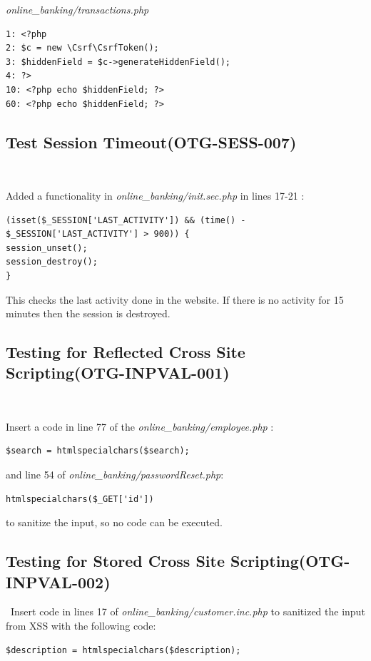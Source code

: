 \documentclass[headsepline,footsepline,footinclude=false,oneside,fontsize=11pt,paper=a4,listof=totoc,bibliography=totoc]{scrbook} %
\begin{document}
\textit{online\_banking/transactions.php}
\begin{lstlisting} 
1: <?php
2: $c = new \Csrf\CsrfToken();
3: $hiddenField = $c->generateHiddenField();
4: ?>
10: <?php echo $hiddenField; ?>
60: <?php echo $hiddenField; ?>
\end{lstlisting}

\pagebreak
\subsection{Test Session Timeout(OTG-SESS-007)}\

Added a functionality in \textit{online\_banking/init.sec.php} in lines 17-21 :  


\begin{lstlisting}
(isset($_SESSION['LAST_ACTIVITY']) && (time() - $_SESSION['LAST_ACTIVITY'] > 900)) { 
session_unset();    
session_destroy();   
}
\end{lstlisting} 


This checks the last activity done in the website. If there is no activity for 15 minutes then the session is destroyed.\\



\subsection{Testing for Reflected Cross Site Scripting(OTG-INPVAL-001)} \

Insert a code in line 77 of the\textit{ online\_banking/employee.php} : 
\begin{lstlisting}
$search = htmlspecialchars($search);  

\end{lstlisting}
and line 54 of \textit{online\_banking/passwordReset.php}:  
\begin{lstlisting} 
htmlspecialchars($_GET['id']) 
\end{lstlisting}
to sanitize the input, so no code can be executed.
\pagebreak
\subsection{Testing for Stored Cross Site Scripting(OTG-INPVAL-002)}\
Insert code in lines 17 of \textit{online\_banking/customer.inc.php} to sanitized the input from XSS with the following code:   

\begin{lstlisting} 
$description = htmlspecialchars($description);
\end{lstlisting}
\end{document}
